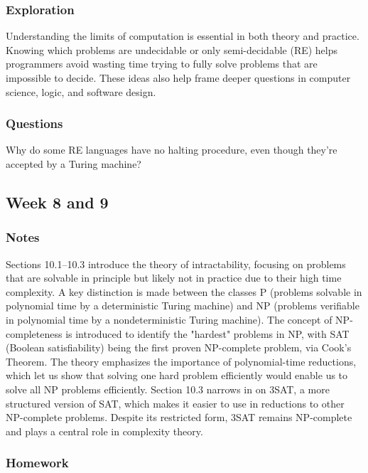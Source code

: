 \documentclass{article}
\theoremstyle{theorem}
\theoremstyle{definition}
\theoremstyle{remark}
\begin{document}
\subsubsection{Exploration}

Understanding the limits of computation is essential in both theory and practice. Knowing which problems are undecidable or only semi-decidable (RE) helps programmers avoid wasting time trying to fully solve problems that are impossible to decide. These ideas also help frame deeper questions in computer science, logic, and software design.



\subsubsection{Questions}

Why do some RE languages have no halting procedure, even though they’re accepted by a Turing machine?

\subsection{Week 8 and 9}

\subsubsection{Notes}

Sections 10.1–10.3 introduce the theory of intractability, focusing on problems that are solvable in principle but likely not in practice due to their high time complexity. A key distinction is made between the classes P (problems solvable in polynomial time by a deterministic Turing machine) and NP (problems verifiable in polynomial time by a nondeterministic Turing machine). The concept of NP-completeness is introduced to identify the "hardest" problems in NP, with SAT (Boolean satisfiability) being the first proven NP-complete problem, via Cook’s Theorem. The theory emphasizes the importance of polynomial-time reductions, which let us show that solving one hard problem efficiently would enable us to solve all NP problems efficiently. Section 10.3 narrows in on 3SAT, a more structured version of SAT, which makes it easier to use in reductions to other NP-complete problems. Despite its restricted form, 3SAT remains NP-complete and plays a central role in complexity theory.

\subsubsection{Homework}
\end{document}
